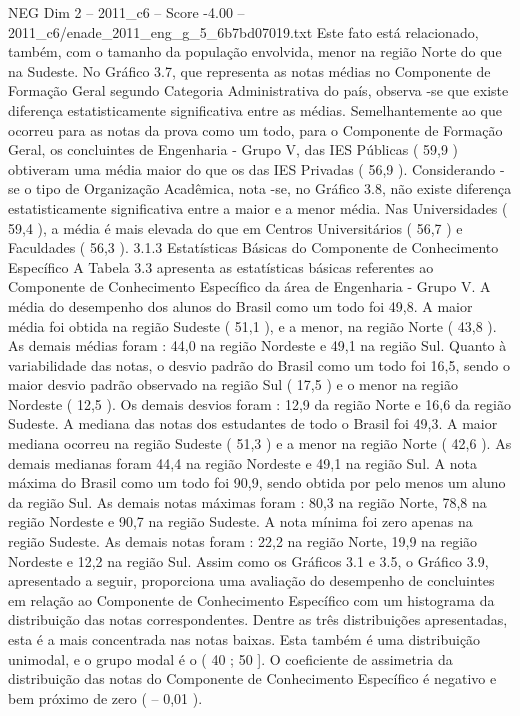 \begin{textsample}{NEG Dim 2 – 2011\_c6 – Score -4.00 – 2011\_c6/enade\_2011\_eng\_g\_5\_6b7bd07019.txt}
Este fato está relacionado, também, com o tamanho da população envolvida, menor na região Norte do que na Sudeste.
No Gráfico 3.7, que representa as notas médias no Componente de Formação Geral segundo Categoria Administrativa do país, observa -se que existe diferença estatisticamente significativa entre as médias.
Semelhantemente ao que ocorreu para as notas da prova como um todo, para o Componente de Formação Geral, os concluintes de Engenharia - Grupo V, das IES Públicas ( 59,9 ) obtiveram uma média maior do que os das IES Privadas ( 56,9 ).
Considerando -se o tipo de Organização Acadêmica, nota -se, no Gráfico 3.8, não existe diferença estatisticamente significativa entre a maior e a menor média.
Nas Universidades ( 59,4 ), a média é mais elevada do que em Centros Universitários ( 56,7 ) e Faculdades ( 56,3 ). 3.1.3 Estatísticas Básicas do Componente de Conhecimento Específico A Tabela 3.3 apresenta as estatísticas básicas referentes ao Componente de Conhecimento Específico da área de Engenharia - Grupo V.
A média do desempenho dos alunos do Brasil como um todo foi 49,8.
A maior média foi obtida na região Sudeste ( 51,1 ), e a menor, na região Norte ( 43,8 ).
As demais médias foram : 44,0 na região Nordeste e 49,1 na região Sul.
Quanto à variabilidade das notas, o desvio padrão do Brasil como um todo foi 16,5, sendo o maior desvio padrão observado na região Sul ( 17,5 ) e o menor na região Nordeste ( 12,5 ).
Os demais desvios foram : 12,9 da região Norte e 16,6 da região Sudeste.
A mediana das notas dos estudantes de todo o Brasil foi 49,3.
A maior mediana ocorreu na região Sudeste ( 51,3 ) e a menor na região Norte ( 42,6 ).
As demais medianas foram 44,4 na região Nordeste e 49,1 na região Sul.
A nota máxima do Brasil como um todo foi 90,9, sendo obtida por pelo menos um aluno da região Sul.
As demais notas máximas foram : 80,3 na região Norte, 78,8 na região Nordeste e 90,7 na região Sudeste.
A nota mínima foi zero apenas na região Sudeste.
As demais notas foram : 22,2 na região Norte, 19,9 na região Nordeste e 12,2 na região Sul.
Assim como os Gráficos 3.1 e 3.5, o Gráfico 3.9, apresentado a seguir, proporciona uma avaliação do desempenho de concluintes em relação ao Componente de Conhecimento Específico com um histograma da distribuição das notas correspondentes.
Dentre as três distribuições apresentadas, esta é a mais concentrada nas notas baixas.
Esta também é uma distribuição unimodal, e o grupo modal é o ( 40 ; 50 ].
O coeficiente de assimetria da distribuição das notas do Componente de Conhecimento Específico é negativo e bem próximo de zero ( – 0,01 ).

\end{textsample}
